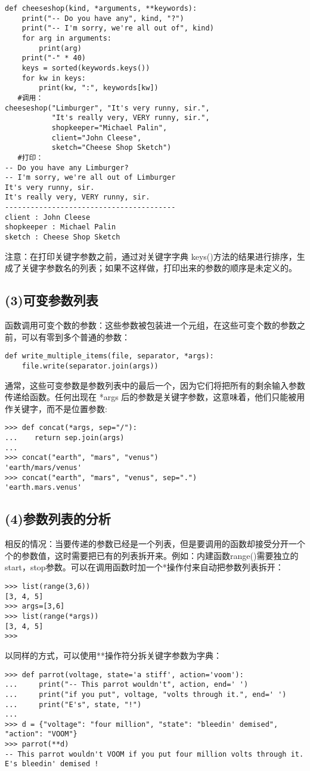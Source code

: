 \documentclass{article}
\begin{document}
\begin{CJK}{UTF8}{gbsn}
\begin{verbatim}
def cheeseshop(kind, *arguments, **keywords):
    print("-- Do you have any", kind, "?")
    print("-- I'm sorry, we're all out of", kind)
    for arg in arguments:
        print(arg)
    print("-" * 40)
    keys = sorted(keywords.keys())
    for kw in keys:
        print(kw, ":", keywords[kw])
   #调用：  
cheeseshop("Limburger", "It's very runny, sir.",
           "It's really very, VERY runny, sir.",
           shopkeeper="Michael Palin",
           client="John Cleese",
           sketch="Cheese Shop Sketch")
   #打印：
-- Do you have any Limburger?
-- I'm sorry, we're all out of Limburger
It's very runny, sir.
It's really very, VERY runny, sir.
----------------------------------------
client : John Cleese
shopkeeper : Michael Palin
sketch : Cheese Shop Sketch
\end{verbatim}
注意：在打印关键字参数之前，通过对关键字字典 keys()方法的结果进行排序，生成了关键字参数名的列表；如果不这样做，打印出来的参数的顺序是未定义的。
\subsection*{(3)可变参数列表}
函数调用可变个数的参数：这些参数被包装进一个元组，在这些可变个数的参数之前，可以有零到多个普通的参数：
\begin{verbatim}
def write_multiple_items(file, separator, *args):
    file.write(separator.join(args))
\end{verbatim}
通常，这些可变参数是参数列表中的最后一个，因为它们将把所有的剩余输入参数传递给函数。任何出现在 *args 后的参数是关键字参数，这意味着，他们只能被用作关键字，而不是位置参数:
\begin{verbatim}
>>> def concat(*args, sep="/"):
...    return sep.join(args)
...
>>> concat("earth", "mars", "venus")
'earth/mars/venus'
>>> concat("earth", "mars", "venus", sep=".")
'earth.mars.venus'
\end{verbatim}
\subsection*{(4)参数列表的分析}
相反的情况：当要传递的参数已经是一个列表，但是要调用的函数却接受分开一个个的参数值，这时需要把已有的列表拆开来。例如：内建函数range()需要独立的start，stop参数。可以在调用函数时加一个*操作付来自动把参数列表拆开：
\begin{verbatim}
>>> list(range(3,6))
[3, 4, 5]
>>> args=[3,6]
>>> list(range(*args))
[3, 4, 5]
>>> 
\end{verbatim}
以同样的方式，可以使用**操作符分拆关键字参数为字典：
\begin{verbatim}
>>> def parrot(voltage, state='a stiff', action='voom'):
...     print("-- This parrot wouldn't", action, end=' ')
...     print("if you put", voltage, "volts through it.", end=' ')
...     print("E's", state, "!")
...
>>> d = {"voltage": "four million", "state": "bleedin' demised", "action": "VOOM"}
>>> parrot(**d)
-- This parrot wouldn't VOOM if you put four million volts through it. E's bleedin' demised !
\end{verbatim}

\end{CJK}
\end{document}
